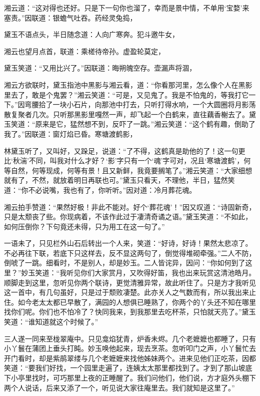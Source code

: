 \documentclass[12pt,oneside]{book}
\begin{document}
湘云道：“这对得也还好。只是下一句你也溜了，幸而是景中情，不单用‘宝婺’来塞责。”因联道：银蟾气吐吞。药经灵兔捣，

黛玉不语点头，半日随念道：人向广寒奔。犯斗邀牛女，

湘云也望月点首，联道：乘槎待帝孙。虚盈轮莫定，

黛玉笑道：“又用比兴了。”因联道：晦朔魄空存。壶漏声将涸，

湘云方欲联时，黛玉指池中黑影与湘云看，道：“你看那河里，怎么像个人在黑影里去了，敢是个鬼罢？”湘云笑道：“可是，又见鬼了。我是不怕鬼的，等我打它一下。”因弯腰拾了一块小石片，向那池中打去，只听打得水响，一个大圆圈将月影荡散复聚者几次。只听那黑影里嘎然一声，却飞起一个白鹤来，直往藕香榭去了。黛玉笑道：“原来是它，猛然想不到，反吓了一跳。”湘云笑道：“这个鹤有趣，倒助了我了。”因联道：窗灯焰已昏。寒塘渡鹤影，

林黛玉听了，又叫好，又跺足，说道：“了不得，这鹤真是助他的了！这一句更比‘秋湍’不同，叫我对什么才好？‘影’字只有一个‘魂’字可对，况且‘寒塘渡鹤’，何等自然，何等现成，何等有景！且又新鲜，我竟要搁笔了。”湘云笑道：“大家细想就有了，不然，就放着明日再联也可。”黛玉只看天，不理他，半日，猛然笑道：“你不必说嘴，我也有了，你听听。”因对道：冷月葬花魂。

湘云拍手赞道：“果然好极！非此不能对。好个‘葬花魂’！”因又叹道：“诗固新奇，只是太颓丧了些。你现病着，不该作此过于凄清奇谲之语。”黛玉笑道：“不如此，如何压倒你？下句竟还未得，只为用工在这一句了。”

一语未了，只见栏外山石后转出一个人来，笑道：“好诗，好诗！果然太悲凉了。不必再往下联，若底下只这样去，反不显这两句了，倒觉得堆砌牵强。”二人不防，倒唬了一跳。细看时，不是别人，却是妙玉。二人皆诧异，因问：“你如何到了这里？”妙玉笑道：“我听见你们大家赏月，又吹得好笛，我也出来玩赏这清池皓月。顺脚走到这里，忽听见你两个联诗，更觉清雅异常，故此听住了。只是方才我听见这一首中，有几句虽好，只是过于颓败凄楚。此亦关人之气数而有，所以我出来止住。如今老太太都已早散了，满园的人想俱已睡熟了，你两个的丫头还不知在哪里找你们呢。你们也不怕冷了？快同我来，到我那里去吃杯茶，只怕就天亮了。”黛玉笑道：“谁知道就这个时候了。”

三人遂一同来至栊翠庵中。只见龛焰犹青，炉香未烬。几个老嬷嬷也都睡了，只有小丫鬟在蒲团上垂头打盹。妙玉唤他起来，现去烹茶。忽听叩门之声，小丫鬟忙去开门看时，却是紫鹃翠缕与几个老嬷嬷来找他姊妹两个。进来见他们正吃茶，因都笑道：“要我们好找，一个园里走遍了，连姨太太那里都找到了。才到了那山坡底下小亭里找时，可巧那里上夜的正睡醒了。我们问他们，他们说，方才庭外头棚下两个人说话，后来又添了一个，听见说大家往庵里去。我们就知是这里了。”
\end{document}
